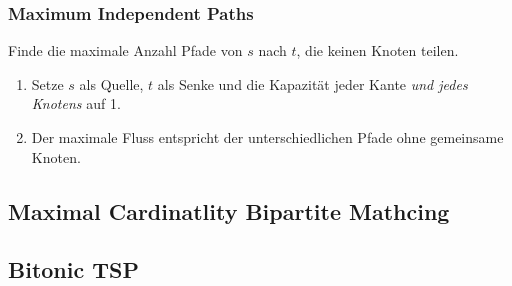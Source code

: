 \subsubsection{Maximum Independent Paths}
Finde die maximale Anzahl Pfade von $s$ nach $t$, die keinen Knoten teilen.
\begin{enumerate}
	\item Setze $s$ als Quelle, $t$ als Senke und die Kapazität jeder Kante \emph{und jedes Knotens} auf 1.
	\item Der maximale Fluss entspricht der unterschiedlichen Pfade ohne gemeinsame Knoten.
\end{enumerate}

\subsection{Maximal Cardinatlity Bipartite Mathcing}


\subsection{Bitonic TSP}



